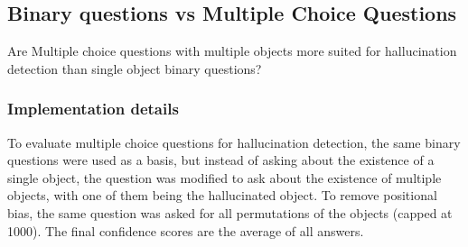 



\FloatBarrier
\subsection{Binary questions vs Multiple Choice Questions}

\begin{formal}
	Are Multiple choice questions with multiple objects more suited for hallucination detection than single object binary questions?
\end{formal}

\subsubsection{Implementation details}
To evaluate multiple choice questions for hallucination detection, the same binary questions were used as a basis, but instead of asking about the existence of a single object, the question was modified to ask about the existence of multiple objects, with one of them being the hallucinated object. To remove positional bias, the same question was asked for all permutations of the objects (capped at 1000). The final confidence scores are the average of all answers.

